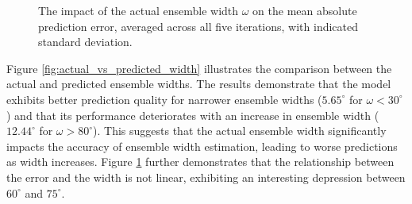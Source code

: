\documentclass{article}
\begin{document}
\begin{figure}[ht]
\begin{minipage}[t]{0.45\linewidth}
    \caption{\label{fig:mae_width}The impact of the actual ensemble width $\omega$ on the mean absolute prediction error, averaged across all five iterations, with indicated standard deviation.}
  \end{minipage}
\end{figure}

Figure \ref{fig:actual_vs_predicted_width} illustrates the comparison between the actual and predicted ensemble widths. The results demonstrate that the model exhibits better prediction quality for narrower ensemble widths ($5.65^\circ$ for $\omega < 30^\circ$) and that its performance deteriorates with an increase in ensemble width ($12.44^\circ$ for $\omega > 80^\circ$). This suggests that the actual ensemble width significantly impacts the accuracy of ensemble width estimation, leading to worse predictions as width increases. Figure \ref{fig:mae_width} further demonstrates that the relationship between the error and the width is not linear, exhibiting an interesting depression between $60^\circ$ and $75^\circ$. 
\end{document}
